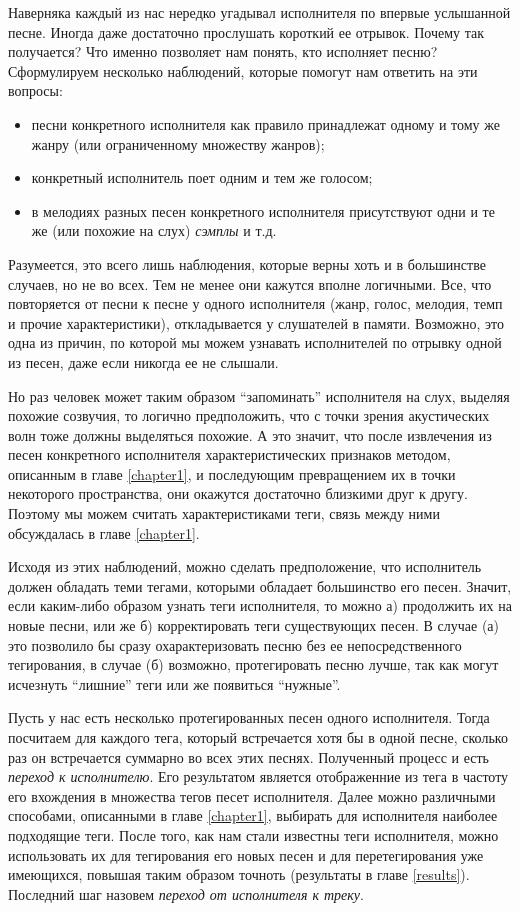 Наверняка каждый из нас нередко угадывал исполнителя по впервые услышанной песне. Иногда даже достаточно прослушать короткий ее отрывок. Почему так получается? 
Что именно позволяет нам понять, кто исполняет песню? 
Сформулируем несколько наблюдений, которые помогут нам ответить на эти вопросы:
\begin{itemize}
 \item песни конкретного исполнителя как правило принадлежат одному и тому же жанру (или ограниченному множеству жанров);
 \item конкретный исполнитель поет одним и тем же голосом;
 \item в мелодиях разных песен конкретного исполнителя присутствуют одни и те же (или похожие на слух) \emph{сэмплы} и т.д.
\end{itemize}
Разумеется, это всего лишь наблюдения, которые верны хоть и в большинстве случаев, но не во всех. Тем не менее они кажутся вполне логичными.
Все, что повторяется от песни к песне у одного исполнителя (жанр, голос, мелодия, темп и прочие характеристики), откладывается у слушателей в памяти.
Возможно, это одна из причин, по которой мы можем узнавать исполнителей по отрывку одной из песен, даже если никогда ее не слышали.

Но раз человек может таким образом ``запоминать'' исполнителя на слух, выделяя похожие созвучия, то логично предположить, что с точки зрения акустических волн тоже должны выделяться похожие.
А это значит, что после извлечения из песен конкретного исполнителя  характеристических признаков методом, описанным в главе \ref{chapter1}, 
и последующим превращением их в точки некоторого пространства, они окажутся достаточно близкими друг к другу. 
Поэтому мы можем считать характеристиками теги, связь между ними обсуждалась в главе \ref{chapter1}.

Исходя из этих наблюдений, можно сделать предположение, что исполнитель должен обладать теми тегами, которыми обладает большинство его песен.
Значит, если каким-либо образом узнать теги исполнителя, то можно а) продолжить их на новые песни, или же б) корректировать теги существующих песен.
В случае (а) это позволило бы сразу охарактеризовать песню без ее непосредственного тегирования, в случае (б) \ld возможно, 
протегировать песню лучше, так как могут исчезнуть ``лишние'' теги или же появиться ``нужные''.

Пусть у нас есть несколько протегированных песен одного исполнителя. Тогда посчитаем для каждого тега, который встречается хотя бы в одной песне, сколько раз он встречается суммарно во всех этих песнях.
Полученный процесс и есть \emph{переход к исполнителю}. Его результатом является отображенние из тега в частоту его вхождения в множества тегов песет исполнителя. 
Далее можно различными способами, описанными в главе \ref{chapter1}, выбирать для исполнителя наиболее подходящие теги. После того, как нам стали известны теги исполнителя, можно использовать их для 
тегирования его новых песен и для перетегирования уже имеющихся, повышая таким образом точноть (результаты в главе \ref{results}). Последний шаг назовем \emph{переход от исполнителя к треку}.

